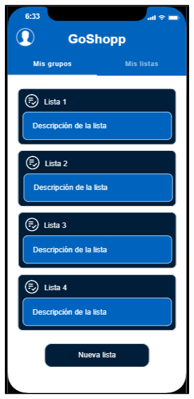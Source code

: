 \documentclass{article}
\begin{document}
\begin{figure}[htbp]
\begin{subfigure}[h]{0.3\textwidth}
    \end{subfigure}
    \hfill
    \begin{subfigure}[h]{0.3\textwidth}
        \includegraphics[width=\textwidth]{imagenes/modelos/listas.png}
    \end{subfigure}


\end{figure}
\end{document}
